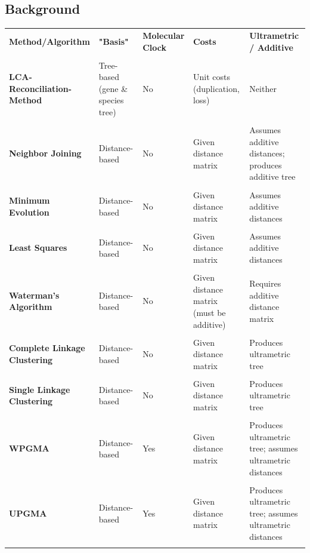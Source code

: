 \subsection{Background}
\begin{table}[H]
    \centering
\begin{tabular}{p{3.5cm}p{3cm}p{2cm}p{3cm}p{3cm}}
\textbf{Method/Algorithm} & \textbf{"Basis"} & \textbf{Molecular Clock} & \textbf{Costs}  & \textbf{Ultrametric / Additive}  \\ \\
\textbf{LCA-Reconciliation-Method} & Tree-based (gene \& species tree) & No & Unit costs (duplication, loss) & Neither \\ \\
\textbf{Neighbor Joining} & \textcolor{amethyst}{Distance-based} & No & \textcolor{amethyst}{Given distance matrix} & Assumes additive distances; produces additive tree \\ \\
\textbf{Minimum Evolution} & \textcolor{amethyst}{Distance-based} & No & \textcolor{amethyst}{Given distance matrix} & Assumes additive distances \\ \\
\textbf{Least Squares} & \textcolor{amethyst}{Distance-based} & No & \textcolor{amethyst}{Given distance matrix} & Assumes additive distances \\ \\
\textbf{Waterman's Algorithm} & \textcolor{amethyst}{Distance-based} & No & \textcolor{amethyst}{Given distance matrix} (must be additive) & Requires additive distance matrix \\ \\
\textbf{Complete Linkage Clustering} & \textcolor{amethyst}{Distance-based} & No & \textcolor{amethyst}{Given distance matrix} & Produces ultrametric tree \\ \\
\textbf{Single Linkage Clustering} & \textcolor{amethyst}{Distance-based} & No & \textcolor{amethyst}{Given distance matrix} & Produces ultrametric tree \\ \\
\textbf{WPGMA} & \textcolor{amethyst}{Distance-based} & \textcolor{bazaar}{Yes} & \textcolor{amethyst}{Given distance matrix} & \textcolor{bazaar}{Produces ultrametric tree; assumes ultrametric distances} \\ \\
\textbf{UPGMA} & \textcolor{amethyst}{Distance-based} & \textcolor{bazaar}{Yes}  & \textcolor{amethyst}{Given distance matrix} & \textcolor{bazaar}{Produces ultrametric tree; assumes ultrametric distances} \\ \\ 

\end{tabular}
\end{table}
